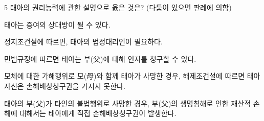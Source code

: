 \begin{question}{5}
태아의 권리능력에 관한 설명으로 옳은 것은? (다툼이 있으면 판례에 의함)
\begin{choices}
  \item 태아는 증여의 상대방이 될 수 있다.
  \item 정지조건설에 따르면, 태아의 법정대리인이 필요하다.
  \item 민법규정에 따르면 태아는 부(父)에 대해 인지를 청구할 수 있다.
  \item 모체에 대한 가해행위로 모(母)와 함께 태아가 사망한 경우, 해제조건설에 따르면 태아 자신은 손해배상청구권을 가지지 못한다.
  \item 태아의 부(父)가 타인의 불법행위로 사망한 경우, 부(父)의 생명침해로 인한 재산적 손해에 대해서는 태아에게 직접 손해배상청구권이 발생한다.
\end{choices}
\end{question}
